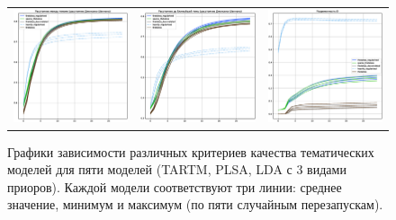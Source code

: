 \begin{figure}
\begin{tabular}{ccc}
    \includegraphics[width=55mm]{images/CH4_improved_diversity_jensenshannon_False.eps} &   \includegraphics[width=55mm]{images/CH4_improved_diversity_jensenshannon_True.eps} & \includegraphics[width=55mm]{images/CH4_improved_SparsityThetaScore.eps} \\ 

\end{tabular} 

    \caption{Графики зависимости различных критериев качества тематических моделей для пяти моделей (TARTM, PLSA, LDA с 3 видами приоров). Каждой модели соответствуют три линии: среднее значение, минимум и максимум (по пяти случайным перезапускам).} 

\label{fig:ch4_improved} 

\end{figure} 

 

 

